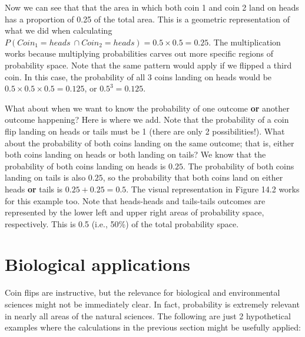 \documentclass[
]{scrbook}
\begin{document}
Now we can see that that the area in which both coin 1 and coin 2 land on heads has a proportion of 0.25 of the total area.
This is a geometric representation of what we did when calculating \(P(Coin_{1} = heads\:\cap Coin_{2} = heads) = 0.5 \times 0.5 = 0.25.\)
The multiplication works because multiplying probabilities carves out more specific regions of probability space.
Note that the same pattern would apply if we flipped a third coin.
In this case, the probability of all 3 coins landing on heads would be \(0.5 \times 0.5 \times 0.5 = 0.125\), or \(0.5^{3} = 0.125\).

What about when we want to know the probability of one outcome \textbf{or} another outcome happening?
Here is where we add.
Note that the probability of a coin flip landing on heads or tails must be 1 (there are only 2 possibilities!).
What about the probability of both coins landing on the same outcome; that is, either both coins landing on heads or both landing on tails?
We know that the probability of both coins landing on heads is \(0.25\).
The probability of both coins landing on tails is also \(0.25\), so the probability that both coins land on either heads \textbf{or} tails is \(0.25 + 0.25 = 0.5\).
The visual representation in Figure 14.2 works for this example too.
Note that heads-heads and tails-tails outcomes are represented by the lower left and upper right areas of probability space, respectively.
This is 0.5 (i.e., 50\%) of the total probability space.

\hypertarget{biological-applications}{%
\section{Biological applications}\label{biological-applications}}

Coin flips are instructive, but the relevance for biological and environmental sciences might not be immediately clear.
In fact, probability is extremely relevant in nearly all areas of the natural sciences.
The following are just 2 hypothetical examples where the calculations in the previous section might be usefully applied:
\end{document}

